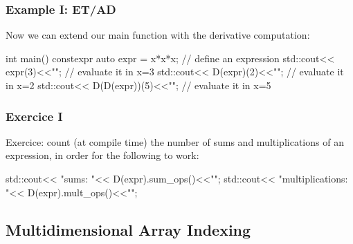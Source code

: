 \documentclass[aspectratio=43]{beamer}
\begin{document}
\begin{frame}[fragile]\frametitle{Example I: ET/AD}
  Now we can extend our main function with the derivative computation:
  \begin{Cpplisting}{}
int main(){
  constexpr auto expr = x*x*x; // define an expression
  std::cout<< expr(3)<<"\n"; // evaluate it in x=3
  std::cout<< D(expr)(2)<<"\n"; // evaluate it in x=2
  std::cout<< D(D(expr))(5)<<"\n"; // evaluate it in x=5
}
  \end{Cpplisting}
\end{frame}


\begin{frame}[fragile]\frametitle{Exercice I}
  Exercice: count (at compile time) the number of sums and multiplications of an expression,
  in order for the following to work:

  \begin{Cpplisting}[: Exercice I]{}
std::cout<< "sums: "<< D(expr).sum_ops()<<"\n";
std::cout<< "multiplications: "<< D(expr).mult_ops()<<"\n";
  \end{Cpplisting}
\end{frame}

\subsection{Multidimensional Array Indexing}
\end{document}
